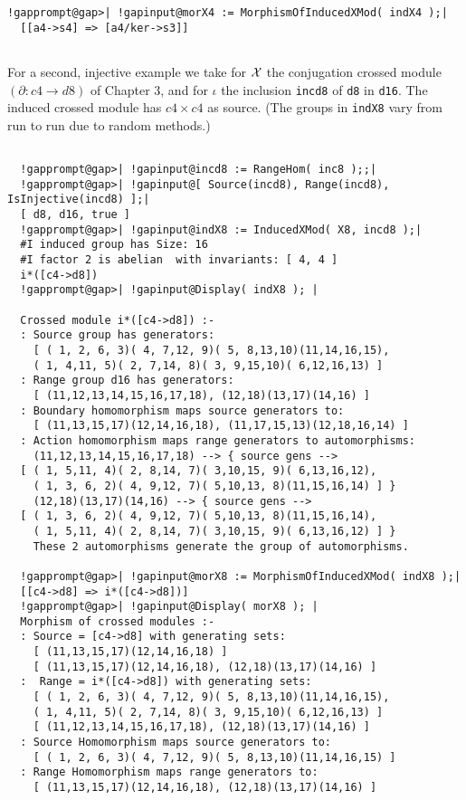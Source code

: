 \documentclass[a4paper,11pt]{report}
\begin{document}
{{\begin{Verbatim}[commandchars=!@|,fontsize=\small,frame=single,label=Example]
  !gapprompt@gap>| !gapinput@morX4 := MorphismOfInducedXMod( indX4 );|
  [[a4->s4] => [a4/ker->s3]]
  
\end{Verbatim}
 For a second, injective example we take for ${\cal X}$ the conjugation crossed module $(\partial : c4 \to d8)$ of Chapter 3, and for $\iota$ the inclusion \texttt{incd8} of \texttt{d8} in \texttt{d16}. The induced crossed module has $c4 \times c4$ as source. (The groups in \texttt{indX8} vary from run to run due to random methods.) 
\begin{Verbatim}[commandchars=!@|,fontsize=\small,frame=single,label=Example]
  
  !gapprompt@gap>| !gapinput@incd8 := RangeHom( inc8 );;|
  !gapprompt@gap>| !gapinput@[ Source(incd8), Range(incd8), IsInjective(incd8) ];|
  [ d8, d16, true ]
  !gapprompt@gap>| !gapinput@indX8 := InducedXMod( X8, incd8 );|
  #I induced group has Size: 16
  #I factor 2 is abelian  with invariants: [ 4, 4 ]
  i*([c4->d8])
  !gapprompt@gap>| !gapinput@Display( indX8 ); |
  
  Crossed module i*([c4->d8]) :- 
  : Source group has generators:
    [ ( 1, 2, 6, 3)( 4, 7,12, 9)( 5, 8,13,10)(11,14,16,15), 
    ( 1, 4,11, 5)( 2, 7,14, 8)( 3, 9,15,10)( 6,12,16,13) ]
  : Range group d16 has generators:
    [ (11,12,13,14,15,16,17,18), (12,18)(13,17)(14,16) ]
  : Boundary homomorphism maps source generators to:
    [ (11,13,15,17)(12,14,16,18), (11,17,15,13)(12,18,16,14) ]
  : Action homomorphism maps range generators to automorphisms:
    (11,12,13,14,15,16,17,18) --> { source gens --> 
  [ ( 1, 5,11, 4)( 2, 8,14, 7)( 3,10,15, 9)( 6,13,16,12), 
    ( 1, 3, 6, 2)( 4, 9,12, 7)( 5,10,13, 8)(11,15,16,14) ] }
    (12,18)(13,17)(14,16) --> { source gens --> 
  [ ( 1, 3, 6, 2)( 4, 9,12, 7)( 5,10,13, 8)(11,15,16,14), 
    ( 1, 5,11, 4)( 2, 8,14, 7)( 3,10,15, 9)( 6,13,16,12) ] }
    These 2 automorphisms generate the group of automorphisms.
  
  !gapprompt@gap>| !gapinput@morX8 := MorphismOfInducedXMod( indX8 );|
  [[c4->d8] => i*([c4->d8])]
  !gapprompt@gap>| !gapinput@Display( morX8 ); |
  Morphism of crossed modules :- 
  : Source = [c4->d8] with generating sets:
    [ (11,13,15,17)(12,14,16,18) ]
    [ (11,13,15,17)(12,14,16,18), (12,18)(13,17)(14,16) ]
  :  Range = i*([c4->d8]) with generating sets:
    [ ( 1, 2, 6, 3)( 4, 7,12, 9)( 5, 8,13,10)(11,14,16,15), 
    ( 1, 4,11, 5)( 2, 7,14, 8)( 3, 9,15,10)( 6,12,16,13) ]
    [ (11,12,13,14,15,16,17,18), (12,18)(13,17)(14,16) ]
  : Source Homomorphism maps source generators to:
    [ ( 1, 2, 6, 3)( 4, 7,12, 9)( 5, 8,13,10)(11,14,16,15) ]
  : Range Homomorphism maps range generators to:
    [ (11,13,15,17)(12,14,16,18), (12,18)(13,17)(14,16) ]
  

\end{Verbatim}}}
\end{document}
